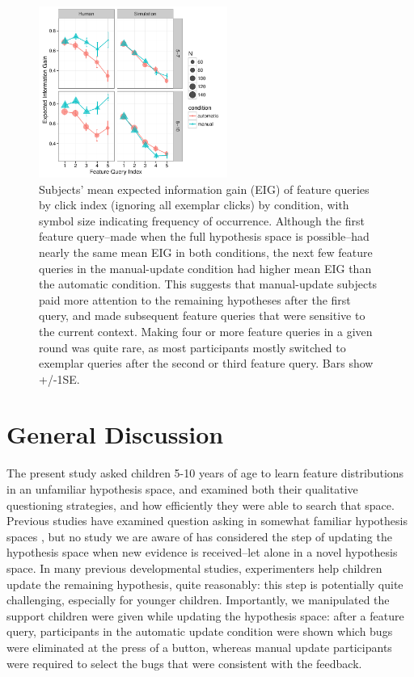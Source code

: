 \documentclass[man,floatsintext]{apa6}
\begin{document}
 \begin{figure}[!h]
 \centering
  \includegraphics[width=0.55\textwidth]{figures/info_gain_by_click_n_age_w_sims} %
  \caption{Subjects' mean expected information gain (EIG) of feature queries by click index (ignoring all exemplar clicks) by condition, with symbol size indicating frequency of occurrence. Although the first feature query--made when the full hypothesis space is possible--had nearly the same mean EIG in both conditions, the next few feature queries in the manual-update condition had higher mean EIG than the automatic condition. This suggests that manual-update subjects paid more attention to the remaining hypotheses after the first query, and made subsequent feature queries that were sensitive to the current context. Making four or more feature queries in a given round was quite rare, as most participants mostly switched to exemplar queries after the second or third feature query. Bars show +/-1SE.}
  \label{fig:EIG_by_click}
 \end{figure} 


\section{General Discussion}

The present study asked children 5-10 years of age to learn feature distributions in an unfamiliar hypothesis space, and examined both their qualitative questioning strategies, and how efficiently they were able to search that space. Previous studies have examined question asking in somewhat familiar hypothesis spaces \cite{Herwig:1982,Mosher:1966,Nelson:2014,Ruggeri:2014,Ruggeri}, but no study we are aware of has considered the step of updating the hypothesis space when new evidence is received--let alone in a novel hypothesis space. In many previous developmental studies, experimenters help children update the remaining hypothesis, quite reasonably: this step is potentially quite challenging, especially for younger children.  Importantly, we manipulated the support children were  given while updating the hypothesis space: after a feature query, participants in the 
automatic update condition were shown which bugs were eliminated at the press of 
a button, whereas manual update participants were required to select the bugs that 
were consistent with the feedback. 
\end{document}
